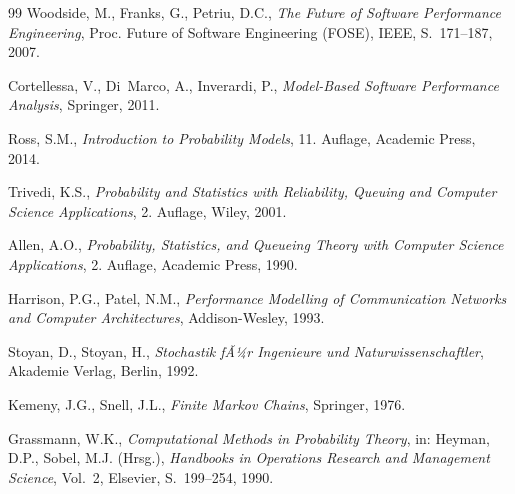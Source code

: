 ﻿\documentclass[a4paper,12pt]{scrreprt}
\theoremstyle{definition}
\begin{document}
\begin{thebibliography}{99}
	Woodside, M., Franks, G., Petriu, D.C.,
	\textit{The Future of Software Performance Engineering},
	Proc. Future of Software Engineering (FOSE),
	IEEE, S.~171--187, 2007.
	
	Cortellessa, V., Di~Marco, A., Inverardi, P.,
	\textit{Model-Based Software Performance Analysis},
	Springer, 2011.
	
	Ross, S.M.,
	\textit{Introduction to Probability Models},
	11. Auflage, Academic Press, 2014.
	
	Trivedi, K.S.,
	\textit{Probability and Statistics with Reliability, Queuing
		and Computer Science Applications},
	2. Auflage, Wiley, 2001.
	
	Allen, A.O.,
	\textit{Probability, Statistics, and Queueing Theory with
		Computer Science Applications},
	2. Auflage, Academic Press, 1990.
	
	Harrison, P.G., Patel, N.M.,
	\textit{Performance Modelling of Communication Networks and
		Computer Architectures},
	Addison-Wesley, 1993.
	
	Stoyan, D., Stoyan, H.,
	\textit{Stochastik fÃ¼r Ingenieure und Naturwissenschaftler},
	Akademie Verlag, Berlin, 1992.
	
	Kemeny, J.G., Snell, J.L.,
	\textit{Finite Markov Chains},
	Springer, 1976.
	
	Grassmann, W.K.,
	\textit{Computational Methods in Probability Theory},
	in: Heyman, D.P., Sobel, M.J. (Hrsg.),
	\textit{Handbooks in Operations Research and Management Science},
	Vol.~2, Elsevier, S.~199--254, 1990.
	
\end{thebibliography}
	
\end{document}
